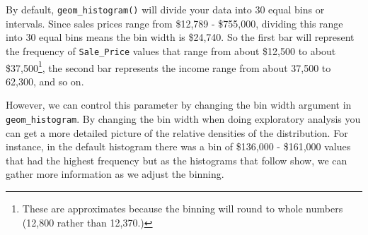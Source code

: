 \documentclass[]{article}
\newenvironment{Shaded}{\begin{snugshade}}{\end{snugshade}}
\newcommand{\KeywordTok}[1]{\textcolor[rgb]{0.13,0.29,0.53}{\textbf{#1}}}
\newcommand{\DataTypeTok}[1]{\textcolor[rgb]{0.13,0.29,0.53}{#1}}
\newcommand{\DecValTok}[1]{\textcolor[rgb]{0.00,0.00,0.81}{#1}}
\newcommand{\StringTok}[1]{\textcolor[rgb]{0.31,0.60,0.02}{#1}}
\newcommand{\OperatorTok}[1]{\textcolor[rgb]{0.81,0.36,0.00}{\textbf{#1}}}
\newcommand{\NormalTok}[1]{#1}
\let\rmarkdownfootnote\footnote%
\def\footnote{\protect\rmarkdownfootnote}
\begin{document}
By default, \texttt{geom\_histogram()} will divide your data into 30
equal bins or intervals. Since sales prices range from \$12,789 -
\$755,000, dividing this range into 30 equal bins means the bin width is
\$24,740. So the first bar will represent the frequency of
\texttt{Sale\_Price} values that range from about \$12,500 to about
\$37,500\footnote{These are approximates because the binning will round
  to whole numbers (12,800 rather than 12,370.)}, the second bar
represents the income range from about 37,500 to 62,300, and so on.

However, we can control this parameter by changing the bin width
argument in \texttt{geom\_histogram}. By changing the bin width when
doing exploratory analysis you can get a more detailed picture of the
relative densities of the distribution. For instance, in the default
histogram there was a bin of \$136,000 - \$161,000 values that had the
highest frequency but as the histograms that follow show, we can gather
more information as we adjust the binning.

\begin{Shaded}
\end{Shaded}
\end{document}

